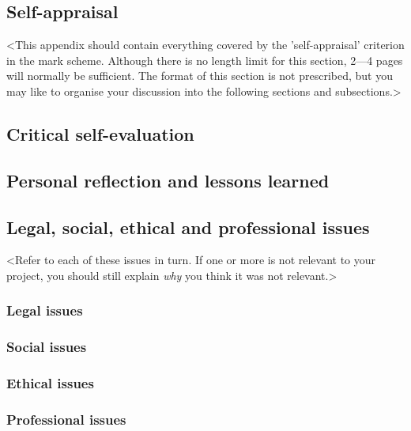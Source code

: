 \begin{appendices}

%
%
\chapter{Self-appraisal}

<This appendix should contain everything covered by the 'self-appraisal' criterion in the mark scheme. Although there is no length limit for this section, 2---4 pages will normally be sufficient. The format of this section is not prescribed, but you may like to organise your discussion into the following sections and subsections.>

\section{Critical self-evaluation}

\section{Personal reflection and lessons learned}

\section{Legal, social, ethical and professional issues}

<Refer to each of these issues in turn. If one or more is not relevant to your project, you should still explain {\em why} you think it was not relevant.>

\subsection{Legal issues}

\subsection{Social issues}

\subsection{Ethical issues}

\subsection{Professional issues}



\end{appendices}
